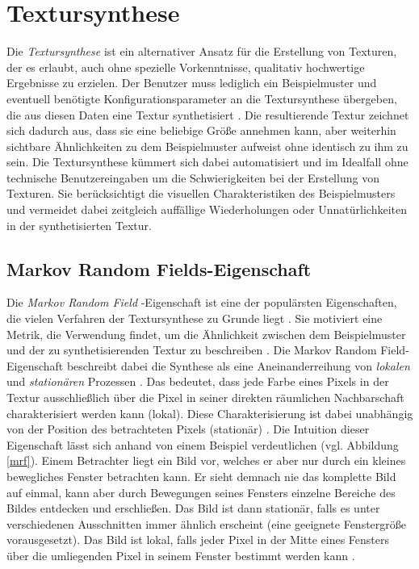 \section{Textursynthese}

Die \emph{Textursynthese} ist ein alternativer Ansatz für die Erstellung von Texturen, der es erlaubt, auch ohne spezielle Vorkenntnisse, qualitativ hochwertige Ergebnisse zu erzielen.
Der Benutzer muss lediglich ein Beispielmuster und eventuell benötigte Konfigurationsparameter an die Textursynthese übergeben, die aus diesen Daten eine Textur synthetisiert \cite{StateOfTheArt}.
Die resultierende Textur zeichnet sich dadurch aus, dass sie eine beliebige Größe annehmen kann, aber weiterhin sichtbare Ähnlichkeiten zu dem Beispielmuster aufweist ohne identisch zu ihm zu sein.
Die Textursynthese kümmert sich dabei automatisiert und im Idealfall ohne technische Benutzereingaben um die Schwierigkeiten bei der Erstellung von Texturen.
Sie berücksichtigt die visuellen Charakteristiken des Beispielmusters und vermeidet dabei zeitgleich auffällige Wiederholungen oder Unnatürlichkeiten in der synthetisierten Textur.

\subsection{\glqq Markov Random Fields\grqq -Eigenschaft}

Die \emph{\glqq Markov Random Field\grqq} -Eigenschaft ist eine der populärsten Eigenschaften, die vielen Verfahren der Textursynthese zu Grunde liegt \cite{StateOfTheArt}.
Sie motiviert eine Metrik, die Verwendung findet, um die Ähnlichkeit zwischen dem Beispielmuster und der zu synthetisierenden Textur zu beschreiben \cite{TextureOptimization}.
Die \glqq Markov Random Field\grqq -Eigenschaft beschreibt dabei die Synthese als eine Aneinanderreihung von \emph{lokalen} und \emph{stationären} Prozessen \cite{StateOfTheArt}.
Das bedeutet, dass jede Farbe eines Pixels in der Textur ausschließlich über die Pixel in seiner direkten räumlichen Nachbarschaft charakterisiert werden kann (lokal).
Diese Charakterisierung ist dabei unabhängig von der Position des betrachteten Pixels (stationär) \cite{TextureOptimization}.
Die Intuition dieser Eigenschaft lässt sich anhand von einem Beispiel verdeutlichen (vgl. Abbildung \ref{mrf}).
Einem Betrachter liegt ein Bild vor, welches er aber nur durch ein kleines bewegliches Fenster betrachten kann.
Er sieht demnach nie das komplette Bild auf einmal, kann aber durch Bewegungen seines Fensters einzelne Bereiche des Bildes entdecken und erschließen.
Das Bild ist dann stationär, falls es unter verschiedenen Ausschnitten immer ähnlich erscheint (eine geeignete Fenstergröße vorausgesetzt).
Das Bild ist lokal, falls jeder Pixel in der Mitte eines Fensters über die umliegenden Pixel in seinem Fenster bestimmt werden kann \cite{StateOfTheArt}.

